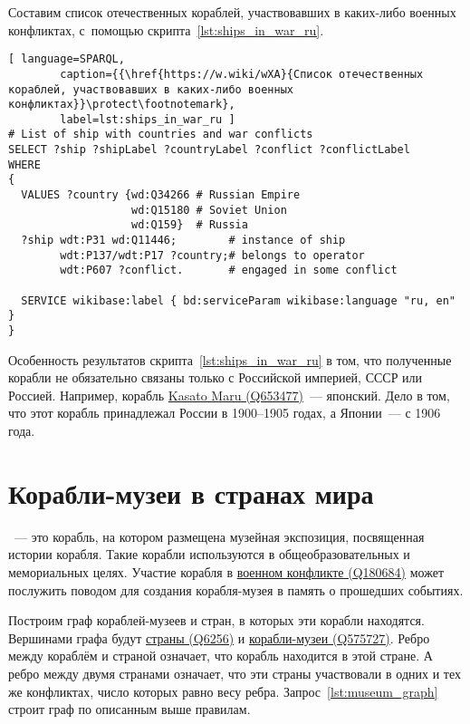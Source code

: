 \newpage
Составим список отечественных кораблей, 
участвовавших в каких-либо военных конфликтах, 
с~помощью скрипта~\ref{lst:ships_in_war_ru}.

\begin{lstlisting}[ language=SPARQL, 
        caption={{\href{https://w.wiki/wXA}{Список отечественных кораблей, участвовавших в каких-либо военных конфликтах}}\protect\footnotemark}, 
        label=lst:ships_in_war_ru ]
# List of ship with countries and war conflicts
SELECT ?ship ?shipLabel ?countryLabel ?conflict ?conflictLabel
WHERE
{
  VALUES ?country {wd:Q34266 # Russian Empire
                   wd:Q15180 # Soviet Union
                   wd:Q159}  # Russia
  ?ship wdt:P31 wd:Q11446;        # instance of ship
        wdt:P137/wdt:P17 ?country;# belongs to operator
        wdt:P607 ?conflict.       # engaged in some conflict

  SERVICE wikibase:label { bd:serviceParam wikibase:language "ru, en" }
}
\end{lstlisting}

Особенность результатов скрипта~\ref{lst:ships_in_war_ru} в том, 
что полученные корабли не обязательно связаны только с Российской империей, 
СССР или Россией. 
Например, корабль \href{https://www.wikidata.org/wiki/Q653477}{Kasato Maru (Q653477)}~--- японский. 
Дело в том, что этот корабль принадлежал России в 1900--1905 годах, а Японии~--- с 1906 года.



\section{Корабли-музеи в странах мира}

~--- это корабль, на котором размещена музейная экспозиция, посвященная истории корабля. Такие корабли используются в общеобразовательных и мемориальных целях. Участие корабля в \href{https://www.wikidata.org/wiki/Q180684}{военном конфликте (Q180684)} может послужить поводом для создания корабля-музея в память о прошедших событиях. 

Построим граф кораблей-музеев и стран, в которых эти корабли находятся. 
Вершинами графа будут \href{https://www.wikidata.org/wiki/Q6256}{страны (Q6256)} и 
\href{https://www.wikidata.org/wiki/Q575727}{корабли-музеи (Q575727)}. 
Ребро между кораблём и страной означает, что корабль находится в этой стране. 
А ребро между двумя странами означает, 
что эти страны участвовали в одних и тех же конфликтах, число которых равно весу ребра. 
Запрос~\ref{lst:museum_graph} строит граф по описанным выше правилам.

